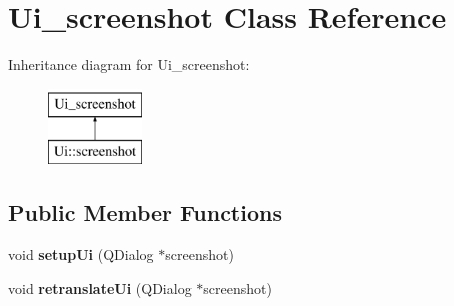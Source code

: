 \hypertarget{classUi__screenshot}{
\section{Ui\_\-screenshot Class Reference}
\label{classUi__screenshot}
}
Inheritance diagram for Ui\_\-screenshot:\begin{figure}[H]
\begin{center}
\leavevmode
\includegraphics[height=2.000000cm]{classUi__screenshot}
\end{center}
\end{figure}
\subsection*{Public Member Functions}
\begin{DoxyCompactItemize}
\item 
\hypertarget{classUi__screenshot_a2953c741ab7b0b4aa2901f3fa3326bc3}{
void {\bfseries setupUi} (QDialog $\ast$screenshot)}
\label{classUi__screenshot_a2953c741ab7b0b4aa2901f3fa3326bc3}

\item 
\hypertarget{classUi__screenshot_afefaa506ec424c6c481a953afea4187e}{
void {\bfseries retranslateUi} (QDialog $\ast$screenshot)}
\label{classUi__screenshot_afefaa506ec424c6c481a953afea4187e}

\end{DoxyCompactItemize}
